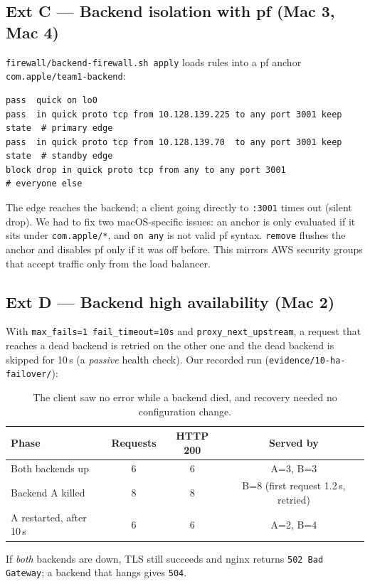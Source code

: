 \documentclass[11pt,a4paper]{article}
\newcommand{\cmd}[1]{\texttt{#1}}
\begin{document}
\subsection{Ext C --- Backend isolation with pf (Mac 3, Mac 4)}
\cmd{firewall/backend-firewall.sh apply} loads rules into a pf anchor
\cmd{com.apple/team1-backend}:
\begin{lstlisting}
pass  quick on lo0
pass  in quick proto tcp from 10.128.139.225 to any port 3001 keep state  # primary edge
pass  in quick proto tcp from 10.128.139.70  to any port 3001 keep state  # standby edge
block drop in quick proto tcp from any to any port 3001                   # everyone else
\end{lstlisting}
The edge reaches the backend; a client going directly to \cmd{:3001} times
out (silent drop). We had to fix two macOS-specific issues: an anchor is only
evaluated if it sits under \cmd{com.apple/*}, and \cmd{on any} is not valid pf
syntax. \cmd{remove} flushes the anchor and disables pf only if it was off
before. This mirrors AWS security groups that accept traffic only from the
load balancer.

\subsection{Ext D --- Backend high availability (Mac 2)}
With \cmd{max\_fails=1 fail\_timeout=10s} and \cmd{proxy\_next\_upstream},
a request that reaches a dead backend is retried on the other one and the dead
backend is skipped for 10\,s (a \emph{passive} health check). Our recorded run
(\cmd{evidence/10-ha-failover/}):

\begin{table}[h]
\centering
\begin{tabular}{l c c c}
\toprule
\textbf{Phase} & \textbf{Requests} & \textbf{HTTP 200} & \textbf{Served by} \\
\midrule
Both backends up & 6 & 6 & A=3, B=3 \\
Backend A killed & 8 & 8 & B=8 (first request 1.2\,s, retried) \\
A restarted, after 10\,s & 6 & 6 & A=2, B=4 \\
\bottomrule
\end{tabular}
\caption{The client saw no error while a backend died, and recovery needed no configuration change.}
\end{table}
\noindent If \emph{both} backends are down, TLS still succeeds and nginx
returns \cmd{502 Bad Gateway}; a backend that hangs gives \cmd{504}.
\end{document}

